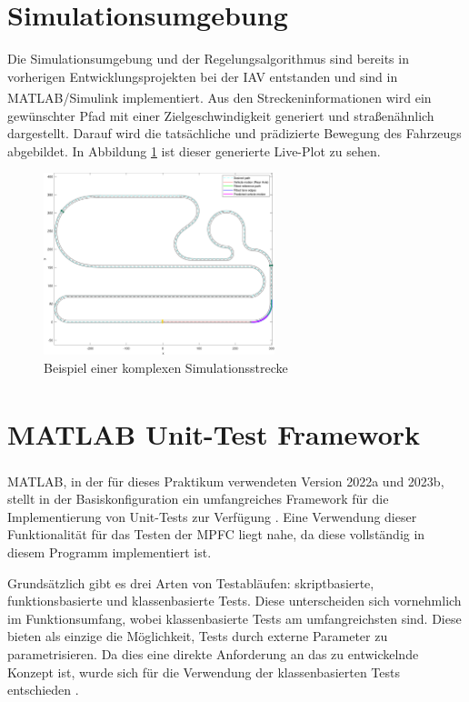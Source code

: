 \section{Simulationsumgebung} \label{sec:Simulationsumgebung}
Die Simulationsumgebung und der Regelungsalgorithmus sind bereits in vorherigen Entwicklungsprojekten bei der IAV entstanden und sind in MATLAB\textsuperscript{\textregistered}/Simulink implementiert. Aus den Streckeninformationen wird ein gewünschter Pfad mit einer Zielgeschwindigkeit generiert und straßenähnlich dargestellt. Darauf wird die tatsächliche und prädizierte Bewegung des Fahrzeugs abgebildet.  
In Abbildung \ref{fig:Simulation_Strecke} ist dieser generierte Live-Plot zu sehen.
\begin{figure}[ht]
    \centering
    \includegraphics[width=0.6\textwidth]{figures/3_Implementierung/simulationsumgebung.pdf}
    \caption{Beispiel einer komplexen Simulationsstrecke}
    \label{fig:Simulation_Strecke}
\end{figure}

\section{MATLAB\textsuperscript{\textregistered} Unit-Test Framework} \label{sec:MatlabUnitTest}
MATLAB\textsuperscript{\textregistered}, in der für dieses Praktikum verwendeten Version 2022a und 2023b, stellt in der Basiskonfiguration ein umfangreiches Framework für die Implementierung von Unit-Tests zur Verfügung \cite{matlabTest}. Eine Verwendung dieser Funktionalität für das Testen der MPFC liegt nahe, da diese vollständig in diesem Programm implementiert ist.

Grundsätzlich gibt es drei Arten von Testabläufen: skriptbasierte, funktionsbasierte und klassenbasierte Tests. Diese unterscheiden sich vornehmlich im Funktionsumfang, wobei klassenbasierte Tests am umfangreichsten sind. Diese bieten als einzige die Möglichkeit, Tests durch externe Parameter zu parametrisieren. Da dies eine direkte Anforderung an das zu entwickelnde Konzept ist, wurde sich für die Verwendung der klassenbasierten Tests entschieden \cite{matlabTest}.

